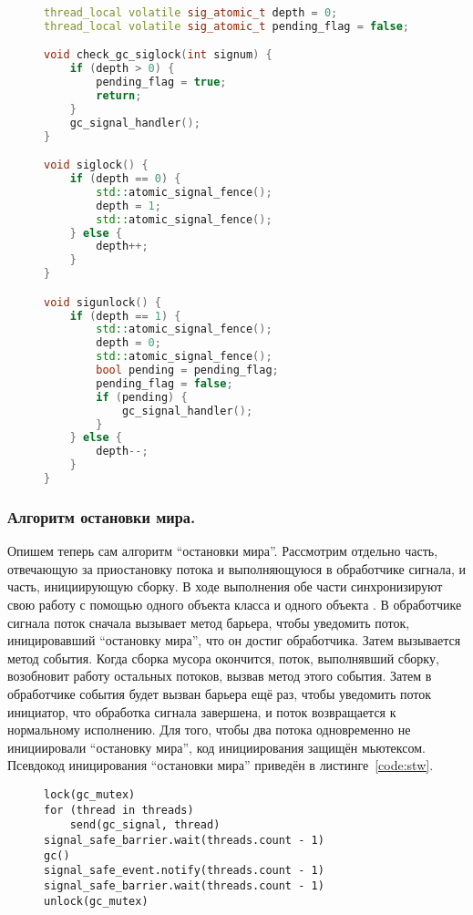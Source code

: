\begin{figure}
\begin{lstlisting}[language={c++}, caption={Блокирование доставки сигналов}, label={code:siglock}, basicstyle=\small]
thread_local volatile sig_atomic_t depth = 0;
thread_local volatile sig_atomic_t pending_flag = false;

void check_gc_siglock(int signum) {
    if (depth > 0) {
        pending_flag = true;
        return;
    }
    gc_signal_handler();
}

void siglock() {
    if (depth == 0) {
        std::atomic_signal_fence();
        depth = 1;
        std::atomic_signal_fence();
    } else {
        depth++;
    }
}

void sigunlock() {
    if (depth == 1) {
        std::atomic_signal_fence();
        depth = 0;
        std::atomic_signal_fence();
        bool pending = pending_flag;
        pending_flag = false;
        if (pending) {
            gc_signal_handler();
        }
    } else {
        depth--;
    }
}
\end{lstlisting}
\end{figure}


\subsubsection{Алгоритм остановки мира.}
Опишем теперь сам алгоритм ``остановки мира''. 
Рассмотрим отдельно часть, отвечающую за приостановку потока и выполняющуюся в 
обработчике сигнала, и часть, инициирующую сборку. 
В ходе выполнения обе части синхронизируют свою работу с помощью одного объекта класса 
 и одного объекта . 
В обработчике сигнала поток сначала вызывает метод  барьера, чтобы 
уведомить поток, иницировавший ``остановку мира'', что он достиг обработчика. 
Затем вызывается метод  события. 
Когда сборка мусора окончится, поток, выполнявший сборку, возобновит работу остальных 
потоков, вызвав метод  этого события. 
Затем в обработчике события будет вызван  барьера ещё раз, чтобы 
уведомить поток инициатор, что обработка сигнала завершена, и поток возвращается к 
нормальному исполнению. 
Для того, чтобы два потока одновременно не инициировали ``остановку мира'', код инициирования 
защищён мьютексом. 
Псевдокод иницирования ``остановки мира'' приведён в листинге~\ref{code:stw}.

\begin{figure}[h!]
\begin{lstlisting}[caption={Остановка мира},label={code:stw}]
lock(gc_mutex)
for (thread in threads)
    send(gc_signal, thread)
signal_safe_barrier.wait(threads.count - 1)
gc()
signal_safe_event.notify(threads.count - 1)
signal_safe_barrier.wait(threads.count - 1)
unlock(gc_mutex)
\end{lstlisting}
\end{figure}


